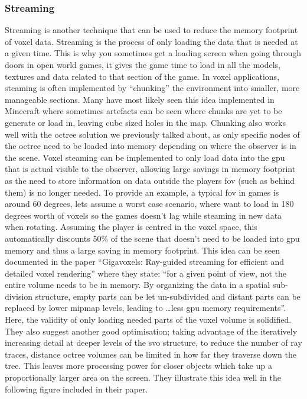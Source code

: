 \documentclass[titlepage]{article}
\begin{document}
\subsubsection*{Streaming}
Streaming is another technique that can be used to reduce the memory footprint of voxel data. Streaming is the process of only loading the data that is needed at a given time. This is why you sometimes get a loading screen when going through doors in open world games, it gives the game time to load in all the models, textures and data related to that section of the game. In voxel applications, steaming is often implemented by ``chunking'' the environment into smaller, more manageable sections. Many have most likely seen this idea implemented in Minecraft \cite{minecraft} where sometimes artefacts can be seen where chunks are yet to be generate or load in, leaving cube sized holes in the map. Chunking also works well with the octree solution we previously talked about, as only specific nodes of the octree need to be loaded into memory depending on where the observer is in the scene. Voxel steaming can be implemented to only load data into the \gls{gpu} that is actual visible to the observer, allowing large savings in memory footprint as the need to store information on data outside the players \gls{fov} (such as behind them) is no longer needed. To provide an example, a typical \gls{fov} in games is around 60 degrees, lets assume a worst case scenario, where want to load in 180 degrees worth of voxels so the games doesn't lag while steaming in new data when rotating. Assuming the player is centred in the voxel space, this automatically discounts 50\% of the scene that doesn't need to be loaded into \gls{gpu} memory and thus a large saving in memory footprint. This idea can be seen documented in the paper ``Gigavoxels: Ray-guided streaming for efficient and detailed voxel rendering'' \cite{streaming} where they state: ``for a given point of view, not the entire volume needs to be in memory. By organizing the data in a spatial sub-division structure, empty parts can be let un-subdivided and distant parts can be replaced by lower mipmap levels, leading to \dots less \gls{gpu} memory requirements''. Here, the validity of only loading needed parts of the voxel volume is solidified. They also suggest another good optimisation; taking advantage of the iteratively increasing detail at deeper levels of the \gls{svo} structure, to reduce the number of ray traces, distance octree volumes can be limited in how far they traverse down the tree. This leaves more processing power for closer objects which take up a proportionally larger area on the screen. They illustrate this idea well in the following figure included in their paper.
\end{document}
